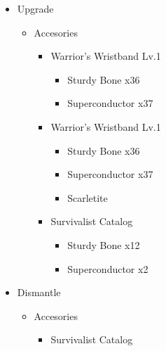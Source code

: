 \vfill
\begin{upgrade}
	\begin{itemize}
		\item Upgrade
			\begin{itemize}
				\item Accesories
					\begin{itemize}
						\item Warrior's Wristband Lv.1
							\begin{itemize}
								\item Sturdy Bone x36
								\item Superconductor x37
							\end{itemize}
						\item Warrior's Wristband Lv.1
							\begin{itemize}
								\item Sturdy Bone x36
								\item Superconductor x37
								\item Scarletite
							\end{itemize}
						\item Survivalist Catalog
							\begin{itemize}
								\item Sturdy Bone x12
								\item Superconductor x2
							\end{itemize}													
					\end{itemize}
			\end{itemize}
		\item Dismantle
			\begin{itemize}
				\item Accesories
					\begin{itemize}
						\item Survivalist Catalog
					\end{itemize}
			\end{itemize}		
	\end{itemize}
\end{upgrade}

